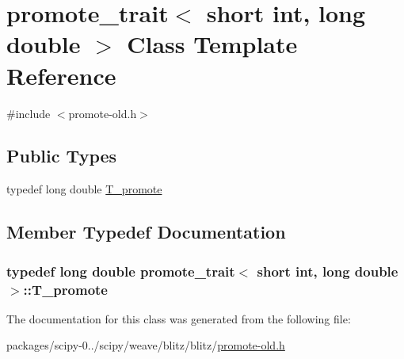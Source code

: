 \hypertarget{classpromote__trait_3_01short_01int_00_01long_01double_01_4}{}\section{promote\+\_\+trait$<$ short int, long double $>$ Class Template Reference}
\label{classpromote__trait_3_01short_01int_00_01long_01double_01_4}


{\ttfamily \#include $<$promote-\/old.\+h$>$}

\subsection*{Public Types}
\begin{DoxyCompactItemize}
\item 
typedef long double \hyperlink{classpromote__trait_3_01short_01int_00_01long_01double_01_4_ac1dd08708c57ebd705e9ace437fa53de}{T\+\_\+promote}
\end{DoxyCompactItemize}


\subsection{Member Typedef Documentation}
\hypertarget{classpromote__trait_3_01short_01int_00_01long_01double_01_4_ac1dd08708c57ebd705e9ace437fa53de}{}
\subsubsection[{T\+\_\+promote}]{\setlength{\rightskip}{0pt plus 5cm}typedef long double {\bf promote\+\_\+trait}$<$ short int, long double $>$\+::{\bf T\+\_\+promote}}\label{classpromote__trait_3_01short_01int_00_01long_01double_01_4_ac1dd08708c57ebd705e9ace437fa53de}


The documentation for this class was generated from the following file\+:\begin{DoxyCompactItemize}
\item 
packages/scipy-\/0../scipy/weave/blitz/blitz/\hyperlink{promote-old_8h}{promote-\/old.\+h}\end{DoxyCompactItemize}
